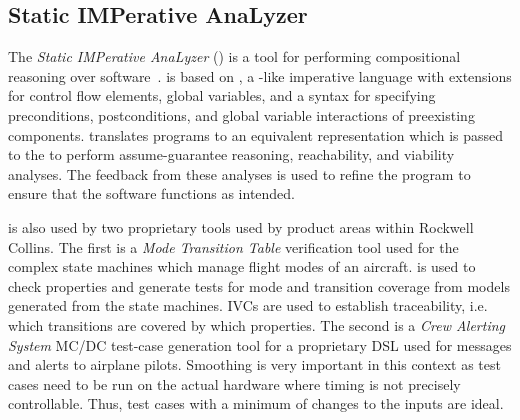 \subsection{Static IMPerative AnaLyzer}

The {\em Static IMPerative AnaLyzer} (\simpal) is a tool for
performing compositional reasoning over
software~\cite{wagner2017spin}. \simpal is based on \limp, a \lustre-like imperative language with extensions for control flow elements, global variables, and a syntax for specifying preconditions, postconditions, and global variable interactions of
preexisting components. \simpal translates \limp programs to an
equivalent \lustre representation which is passed to the \jkind to
perform assume-guarantee reasoning, reachability, and viability
analyses. The feedback from these analyses is used to refine the
program to ensure that the software functions as intended.

\jkind is also used by two proprietary tools used by product areas within Rockwell Collins.  The first is a {\em Mode Transition Table} verification tool used for the complex state machines which manage flight modes of an aircraft.
\jkind is used to check properties and generate tests for mode and transition coverage from \lustre models generated from the state machines.
IVCs are used to establish traceability, i.e. which transitions are covered by which properties.  The second is a {\em Crew Alerting System} MC/DC test-case generation tool for a proprietary DSL used for messages and alerts to airplane pilots.  Smoothing is very important in this context as test cases need to be run on the actual hardware where
timing is not precisely controllable. Thus, test cases with a minimum
of changes to the inputs are ideal.
%
%

